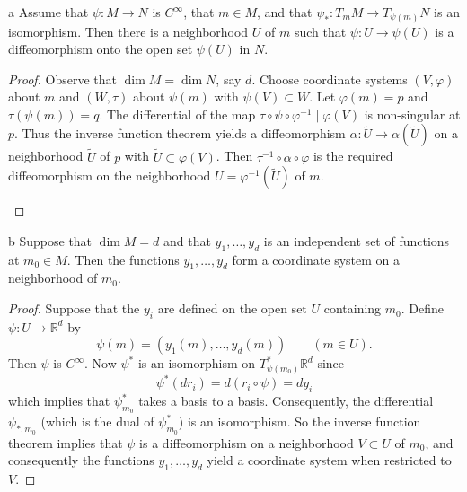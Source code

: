 \begin{corollary*}{a}
	Assume that $\psi\colon M \to N$ is $C^{\infty}$, that $m \in M$, and that $\psi_{*}\colon T_{m} M \to T_{\psi(m)} N$ is an isomorphism. Then there is a neighborhood $U$ of $m$ such that $\psi\colon U \to \psi(U)$ is a diffeomorphism onto the open set $\psi(U)$ in $N$.
\end{corollary*}

\begin{proof}
	Observe that $\dim M = \dim N$, say $d$. Choose coordinate systems $(V, \varphi)$ about $m$ and $(W, \tau)$ about $\psi(m)$ with $\psi(V) \subset W$. Let $\varphi(m) = p$ and $\tau(\psi(m)) = q$. The differential of the map $\tau \circ \psi \circ \varphi^{-1} \mid \varphi(V)$ is non-singular at $p$. Thus the inverse function theorem yields a diffeomorphism $\alpha\colon \tilde{U} \to \alpha(\tilde{U})$ on a neighborhood $\tilde{U}$ of $p$ with $\tilde{U} \subset \varphi(V)$. Then $\tau^{-1} \circ \alpha \circ \varphi$ is the required diffeomorphism on the neighborhood $U = \varphi^{-1}(\tilde{U})$ of $m$.

	\begin{center}
	\end{center}
\end{proof}

\begin{corollary*}{b}
	Suppose that $\dim M = d$ and that $y_1, \ldots, y_d$ is an independent set of functions at $m_0 \in M$. Then the functions $y_1, \ldots, y_d$ form a coordinate system on a neighborhood of $m_0$. 
\end{corollary*}

\begin{proof}
	Suppose that the $y_i$ are defined on the open set $U$ containing $m_0$. Define $\psi\colon U \to \mathbb{R}^d$ by
	\[
		\psi(m)=\left(y_{1}(m),\ldots,y_{d}(m)\right)\qquad(m\in U).
	\]
	Then $\psi$ is $C^{\infty}$. Now $\psi^{*}$ is an isomorphism on $T_{\psi(m_{0})}^{*}\mathbb{R}^{d}$ since
	\[
		\psi^{*}(d r_{i})=d(r_{i}\circ\psi)=d y_{i}
	\]
	which implies that $\psi_{m_0}^{*}$ takes a basis to a basis. Consequently, the differential $\psi_{*,m_0}$ (which is the dual of $\psi_{m_0}^{*}$) is an isomorphism. So the inverse function theorem implies that $\psi$ is a diffeomorphism on a neighborhood $V \subset U$ of $m_0$, and consequently the functions $y_1, \ldots, y_d$ yield a coordinate system when restricted to $V$.
\end{proof}

